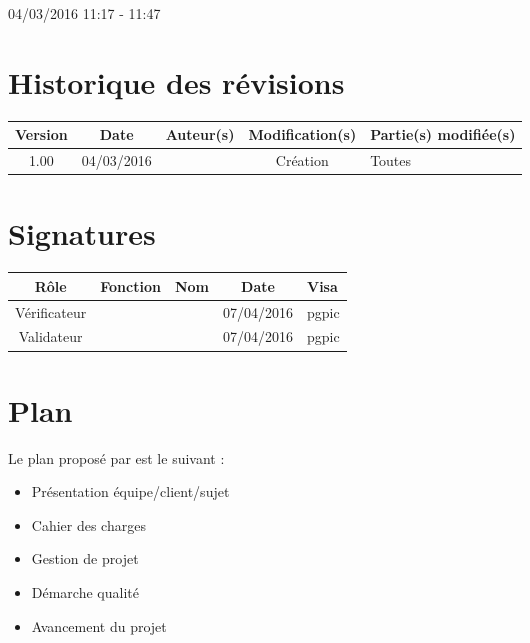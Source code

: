 \documentclass [a4paper] {article}
\begin{document}
04/03/2016			 				%
\hfill   
\hfill 	 11:17 - 11:47 				%



\section*{Historique des révisions}
\begin{center}
			\begin{tabular}{| c | c | c | c | p{4cm} |}
				\hline
				\rowcolor{Gray}
				Version & Date & Auteur(s) & Modification(s) & Partie(s) modifiée(s)		 \\
				\hline
				1.00 & 04/03/2016 & \Pierre & Création & Toutes \\
		\hline		
			\end{tabular}
		\end{center}

\section*{Signatures}

		\begin{center}
			\begin{tabular}{| c | c | c | c | p{4cm} |}
				\hline
				\rowcolor{Gray}
				Rôle & Fonction & Nom & Date & Visa		 \\
				\hline
				Vérificateur & \RQA & \Kafui & 07/04/2016 & pgpic \\[30pt]
				\hline
				Validateur & \CP & \Sergi & 07/04/2016 & pgpic \\[30pt]	
				\hline
			\end{tabular}
		\end{center}
		
\newpage		



\section{Plan}
Le plan proposé par \nomResponsableDGQ{} est le suivant :
\begin{itemize}
\item Présentation équipe/client/sujet
\item Cahier des charges
\item Gestion de projet
\item Démarche qualité
\item Avancement du projet
\end{itemize}
\end{document}
